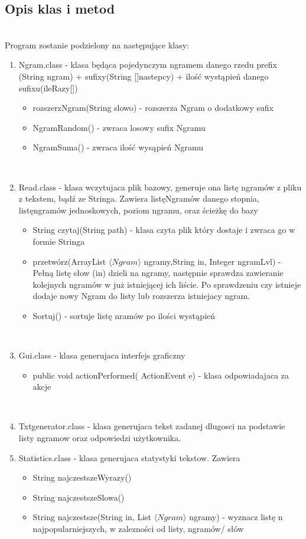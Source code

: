 \documentclass[12pt,a4paper]{article}
\begin{document}
\subsection{Opis klas i metod}
\\
Program zostanie podzielony na następujące klasy:
\begin{enumerate}
\item Ngram.class - klasa będąca pojedynczym ngramem danego rzedu prefix (String ngram) + sufixy(String []nastepcy) + ilość wystąpień danego sufixu(ileRazy[])

\begin{itemize}
	\item rozszerzNgram(String slowo) - rozszerza Ngram o dodatkowy sufix
	\item NgramRandom() - zwraca losowy sufix Ngramu
	\item NgramSuma() - zwraca ilość wysąpień Ngramu
\end{itemize}
\\
\item
Read.class - klasa wczytujaca plik bazowy, generuje ona listę ngramów z pliku z tekstem, bądź ze Stringa. Zawiera listęNgramów danego stopnia, listęngramów jednoskowych, poziom ngramu, oraz ścieżkę do bazy

\begin{itemize}
	\item String czytaj(String path) - klasa czyta plik który dostaje i zwraca go w formie Stringa
	\item przetwórz(ArrayList $\langle Ngram \rangle$ ngramy,String in, Integer ngramLvl) - Pełną listę słow (in) dzieli na ngramy, następnie sprawdza zawieranie kolejnych ngramów w już istniejącej ich liście. Po sprawdzeniu czy istnieje dodaje nowy Ngram do listy lub rozszerza istniejacy ngram.
	\item Sortuj() - sortuje listę nramów po ilości wystąpień
\end{itemize}
\\ 
\item
Gui.class - klasa generujaca interfejs graficzny 
\begin{itemize}
	\item public void actionPerformed( ActionEvent e) - klasa odpowiadajaca za akcje
\end{itemize}
\\

\item
Txtgenerator.class - klasa generujaca tekst zadanej dlugosci na podstawie listy ngramow oraz odpowiedzi użytkownika.
\item
Statistics.class - klasa generujaca statystyki tekstow. Zawiera 
\begin{itemize}
	\item 
String najczestszeWyrazy()
\item
String najczestszeSlowa()
\item
String najczestsze(String in, List $\langle Ngram \rangle$ ngramy) - wyznacz listę n najpopularniejszych, w zalezności od listy, ngramów/ słów
\end{itemize}
\end{enumerate}
\end{document}
